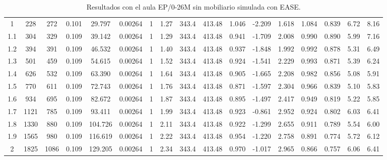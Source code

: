 \begin{landscape}
\begin{table}[ht]
{\begin{tabular}{@{}ccccccccccccccccc@{}}
1 & 228 & 272 & 0.101 & 29.797 & 0.00264 & 1 & 1.27 & 343.4 & 413.48 & 1.046 & -2.209 & 1.618 & 1.084 & 0.839 & 6.72 & 8.16 \\
1.1 & 304 & 329 & 0.109 & 39.142 & 0.00264 & 1 & 1.29 & 343.4 & 413.48 & 0.941 & -1.709 & 2.008 & 0.990 & 0.890 & 5.99 & 7.16 \\
1.2 & 394 & 391 & 0.109 & 46.532 & 0.00264 & 1 & 1.40 & 343.4 & 413.48 & 0.937 & -1.848 & 1.992 & 0.992 & 0.878 & 5.31 & 6.49 \\
1.3 & 501 & 459 & 0.109 & 54.615 & 0.00264 & 1 & 1.52 & 343.4 & 413.48 & 0.924 & -1.541 & 2.229 & 0.993 & 0.871 & 5.39 & 6.24 \\
1.4 & 626 & 532 & 0.109 & 63.390 & 0.00264 & 1 & 1.64 & 343.4 & 413.48 & 0.905 & -1.665 & 2.208 & 0.982 & 0.856 & 5.08 & 5.91 \\
1.5 & 770 & 611 & 0.109 & 72.743 & 0.00264 & 1 & 1.76 & 343.4 & 413.48 & 0.871 & -1.597 & 2.304 & 0.966 & 0.839 & 5.10 & 5.83 \\
1.6 & 934 & 695 & 0.109 & 82.672 & 0.00264 & 1 & 1.87 & 343.4 & 413.48 & 0.895 & -1.497 & 2.417 & 0.949 & 0.819 & 5.22 & 5.85 \\
1.7 & 1121 & 785 & 0.109 & 93.411 & 0.00264 & 1 & 1.99 & 343.4 & 413.48 & 0.923 & -0.861 & 2.952 & 0.924 & 0.802 & 6.03 & 6.41 \\
1.8 & 1330 & 880 & 0.109 & 104.726 & 0.00264 & 1 & 2.11 & 343.4 & 413.48 & 0.922 & -1.299 & 2.655 & 0.911 & 0.789 & 5.54 & 6.00 \\
1.9 & 1565 & 980 & 0.109 & 116.619 & 0.00264 & 1 & 2.22 & 343.4 & 413.48 & 0.954 & -1.220 & 2.758 & 0.891 & 0.774 & 5.72 & 6.12 \\
2 & 1825 & 1086 & 0.109 & 129.205 & 0.00264 & 1 & 2.34 & 343.4 & 413.48 & 0.970 & -1.017 & 2.965 & 0.866 & 0.757 & 6.06 & 6.41 \\ \bottomrule
\end{tabular}
}
\caption{Resultados con el aula EP/0-26M sin mobiliario simulada con EASE.}
\label{tablacompletaeps}
\end{table}



\end{landscape}

